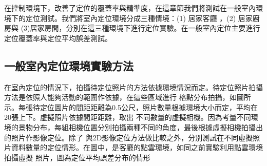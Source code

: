 	在控制環境下，改善了定位的覆蓋率與精準度，在這章節我們將測試在一般室內環境下的定位測試。我們將室內定位環境分成三種情境：(1)
居家客廳 ，(2) 居家廚房與 (3)居家房間，分別在這三種環境下進行定位實驗。在一般室內定位主要進行定位覆蓋率與定位平均誤差測試。
	
\subsection{一般室內定位環境實驗方法}
	
	在室內定位的情況下，拍攝待定位照片的方法依據環境情況而定。待定位照片拍攝方法是依照人能夠活動的範圍作依據，在這些區域進行
格點分布拍攝，如圖所示。每張待定位圖片的間距距離為0.5公尺，照片數量根據環境大小而定，平均在20張上下。虛擬照片依據間距距離，取出
不同數量的虛擬相機。因為考量不同環境的景物分布，每組相機位置分別拍攝兩種不同的角度，最後根據虛擬相機拍攝出的照片作影像定位。除了
與2D影像定位方法做比較之外，分別測試在不同虛擬照片資料數量的定位情形。在圖中，是客廳的點雲環境，如同之前實驗利用點雲環境拍攝虛擬
照片，圖為定位平均誤差分布的情形
	

